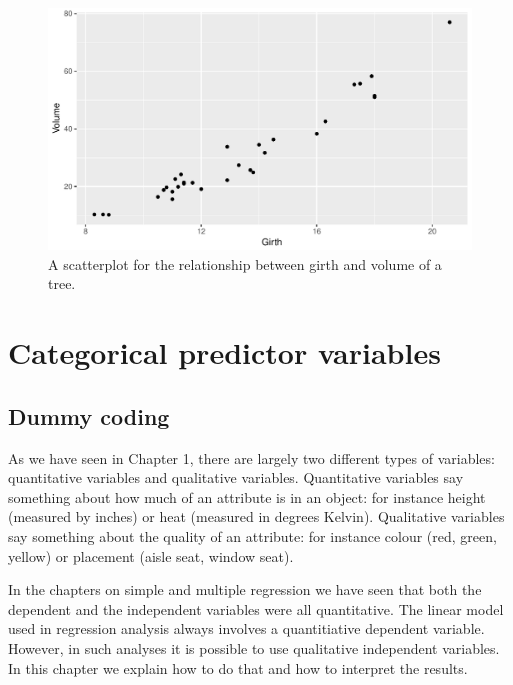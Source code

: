 \documentclass[]{report}\usepackage[]{graphicx}\usepackage[]{color}
\makeatletter
\def\maxwidth{ %
  \ifdim\Gin@nat@width>\linewidth
    \linewidth
  \else
    \Gin@nat@width
  \fi
}
\newenvironment{knitrout}{}{} %
\makeatother
\begin{document}
\begin{knitrout}
\color{fgcolor}\begin{figure}

{\centering \includegraphics[width=\maxwidth]{figure/multi_8-1} 

}

\caption[A scatterplot for the relationship between girth and volume of a tree]{A scatterplot for the relationship between girth and volume of a tree.}\label{fig:multi_8}
\end{figure}


\end{knitrout}



% 
\chapter{Categorical predictor variables}



\section{Dummy coding}
As we have seen in Chapter 1, there are largely two different types of variables: quantitative variables and qualitative variables. Quantitative variables say something about how much of an attribute is in an object: for instance height (measured by inches) or heat (measured in degrees Kelvin). Qualitative variables say something about the quality of an attribute: for instance colour (red, green, yellow) or placement (aisle seat, window seat).

In the chapters on simple and multiple regression we have seen that both the dependent and the independent variables were all quantitative. The linear model used in regression analysis always involves a quantitiative dependent variable. However, in such analyses it is possible to use qualitative independent variables. In this chapter we explain how to do that and how to interpret the results. 
\end{document}
